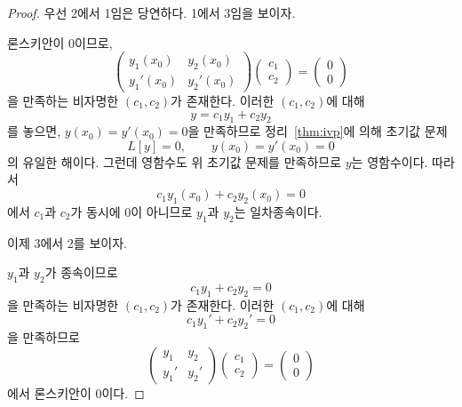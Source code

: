 \documentclass[../engineering_mathematics_lecture_note.tex]{subfiles}
\begin{document}
\begin{proof}
    우선 2에서 1임은 당연하다.
    1에서 3임을 보이자.

    론스키안이 0이므로,
    \begin{equation*}
        \begin{pmatrix}
            y_1(x_0) & y_2(x_0)\\
            y_1'(x_0) & y_2'(x_0)
        \end{pmatrix} \begin{pmatrix}
            c_1 \\ c_2
        \end{pmatrix} = \begin{pmatrix}
            0 \\ 0
        \end{pmatrix}
    \end{equation*}
    을 만족하는 비자명한 $(c_1, c_2)$가 존재한다.
    이러한 $(c_1, c_2)$에 대해
    \begin{equation*}
        y = c_1 y_1 + c_2 y_2
    \end{equation*}
    를 놓으면, $y(x_0) = y'(x_0) = 0$을 만족하므로 정리~\ref{thm:ivp}에 의해 초기값 문제
    \begin{equation*}
        L[y] = 0, \qquad y(x_0) = y'(x_0) = 0
    \end{equation*}
    의 유일한 해이다.
    그런데 영함수도 위 초기값 문제를 만족하므로 $y$는 영함수이다.
    따라서
    \begin{equation*}
        c_1 y_1(x_0) + c_2 y_2(x_0) = 0
    \end{equation*}
    에서 $c_1$과 $c_2$가 동시에 0이 아니므로 $y_1$과 $y_2$는 일차종속이다.

    이제 3에서 2를 보이자.

    $y_1$과 $y_2$가 종속이므로
    \begin{equation*}
        c_1 y_1 + c_2 y_2 = 0
    \end{equation*}
    을 만족하는 비자명한 $(c_1, c_2)$가 존재한다.
    이러한 $(c_1, c_2)$에 대해
    \begin{equation*}
        c_1 y_1' + c_2 y_2' = 0
    \end{equation*}
    을 만족하므로
    \begin{equation*}
        \begin{pmatrix}
            y_1 & y_2\\
            y_1' & y_2'
        \end{pmatrix} \begin{pmatrix}
            c_1 \\ c_2
        \end{pmatrix} = \begin{pmatrix}
            0 \\ 0
        \end{pmatrix}
    \end{equation*}
    에서 론스키안이 0이다.
\end{proof}
\end{document}
